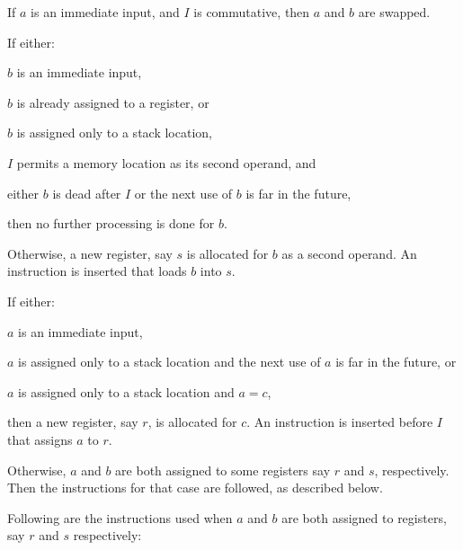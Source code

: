 \begin{legal}
\item If $a$ is an immediate input, and $I$ is commutative, then $a$
  and $b$ are swapped.
\item If either:
  \begin{legal}
  \item $b$ is an immediate input,
  \item $b$ is already assigned to a register, or
    \begin{legal}
    \item $b$ is assigned only to a stack location,
    \item $I$ permits a memory location as its second operand, and
    \item either $b$ is dead after $I$ or the next use of $b$ is far
      in the future,
    \end{legal}
  \end{legal}
  then no further processing is done for $b$.
\item Otherwise, a new register, say $s$ is allocated for $b$ as a
  second operand.  An instruction is inserted that loads $b$ into $s$.
\item If either:
  \begin{legal}
  \item $a$ is an immediate input,
  \item $a$ is assigned only to a stack location and the next use of
    $a$ is far in the future, or
  \item $a$ is assigned only to a stack location and $a = c$,
  \end{legal}
  then a new register, say $r$, is allocated for $c$.  An instruction
  is inserted before $I$ that assigns $a$ to $r$.
\item Otherwise, $a$ and $b$ are both assigned to some registers say
  $r$ and $s$, respectively.  Then the instructions for that case are
  followed, as described below.
\end{legal}

Following are the instructions used when $a$ and $b$ are both assigned
to registers, say $r$ and $s$ respectively:

